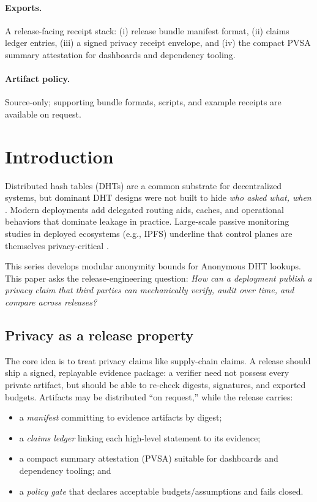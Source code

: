 \documentclass[11pt]{article}
\begin{document}
\paragraph{Exports.}
A release-facing receipt stack: (i) release bundle manifest format, (ii) claims ledger entries,
(iii) a signed privacy receipt envelope, and (iv) the compact PVSA summary attestation for dashboards and dependency tooling.

\paragraph{Artifact policy.}
Source-only; supporting bundle formats, scripts, and example receipts are available on request.\cite{series:artifactpolicy}

\section{Introduction}
Distributed hash tables (DHTs) are a common substrate for decentralized systems, but dominant DHT designs were not built to hide \emph{who asked what, when} \cite{kademlia2002}.
Modern deployments add delegated routing aids, caches, and operational behaviors that dominate leakage in practice.
Large-scale passive monitoring studies in deployed ecosystems (e.g., IPFS) underline that control planes are themselves privacy-critical \cite{balduf_ipfs_monitoring}.

This series develops modular anonymity bounds for Anonymous DHT lookups.
This paper asks the release-engineering question:
\emph{How can a deployment publish a privacy claim that third parties can mechanically verify, audit over time, and compare across releases?}

\subsection{Privacy as a release property}
The core idea is to treat privacy claims like supply-chain claims.
A release should ship a signed, replayable evidence package: a verifier need not possess every private artifact, but should be able to re-check digests, signatures, and exported budgets.
Artifacts may be distributed ``on request,'' while the release carries:
\begin{itemize}[leftmargin=1.2em]
\item a \emph{manifest} committing to evidence artifacts by digest;
\item a \emph{claims ledger} linking each high-level statement to its evidence;
\item a compact summary attestation (PVSA) suitable for dashboards and dependency tooling; and
\item a \emph{policy gate} that declares acceptable budgets/assumptions and fails closed.
\end{itemize}
\end{document}
